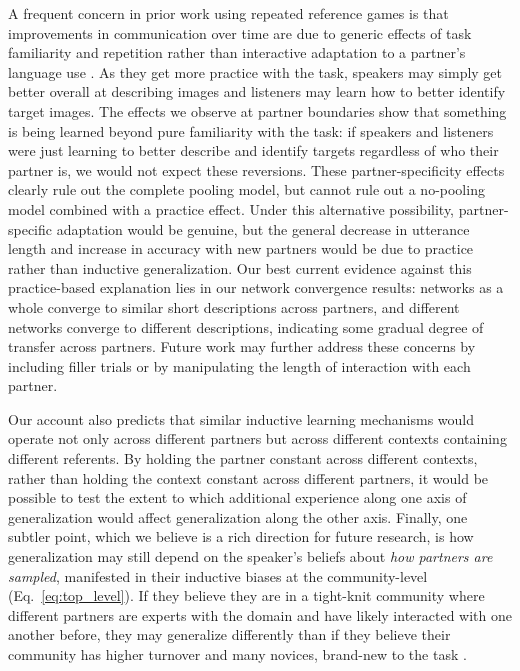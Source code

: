A frequent concern in prior work using repeated reference games is that improvements in communication over time are due to generic effects of task familiarity and repetition rather than interactive adaptation to a partner's language use \cite{HupetChantraine92_CollaborationOrRepitition}. As they get more practice with the task, speakers may simply get better overall at describing images and listeners may learn how to better identify target images. The effects we observe at partner boundaries show that something is being learned beyond pure familiarity with the task: if speakers and listeners were just learning to better describe and identify targets regardless of who their partner is, we would not expect these reversions. These partner-specificity effects clearly rule out the complete pooling model, but cannot rule out a no-pooling model combined with a practice effect. Under this  alternative possibility, partner-specific adaptation would be genuine, but the general decrease in utterance length and increase in accuracy with new partners would be due to practice rather than inductive generalization.
Our best current evidence against this practice-based explanation lies in our network convergence results: networks as a whole converge to similar short descriptions across partners, and different networks converge to different descriptions, indicating some gradual degree of transfer across partners. 
Future work may further address these concerns by including filler trials or by manipulating the length of interaction with each partner.

Our account also predicts that similar inductive learning mechanisms would operate not only across different partners but across different contexts containing different referents. 
By holding the partner constant across different contexts, rather than holding the context constant across different partners, it would be possible to test the extent to which additional experience along one axis of generalization would affect generalization along the other axis. 
Finally, one subtler point, which we believe is a rich direction for future research, is how generalization may still depend on the speaker’s beliefs about \emph{how partners are sampled}, manifested in their inductive biases at the community-level (Eq.~\ref{eq:top_level}).
If they believe they are in a tight-knit community where different partners are experts with the domain and have likely interacted with one another before, they may generalize differently than if they believe their community has higher turnover and many novices, brand-new to the task \cite{IsaacsClark87_ReferencesExpertsNovices}.

